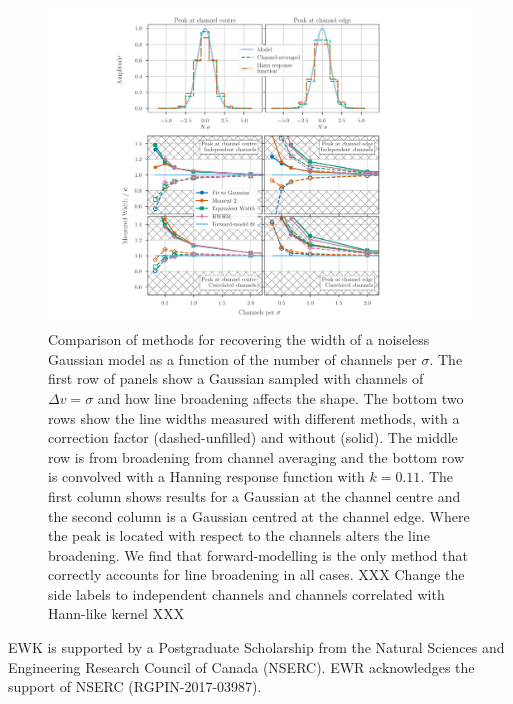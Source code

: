 \documentclass{rnaastex}
\begin{document}
\begin{figure}
\includegraphics[width=\textwidth]{combined_figure}
\caption{\label{fig:width_recovery_comparison} Comparison of methods for recovering the width of a noiseless Gaussian model as a function of the number of channels per $\sigma$. The first row of panels show a Gaussian sampled with channels of $\Delta v=\sigma$ and how line broadening affects the shape.  The bottom two rows show the line widths measured with different methods, with a correction factor (dashed-unfilled) and without (solid). The middle row is from broadening from channel averaging and the bottom row is convolved with a Hanning response function with $k=0.11$. The first column shows results for a Gaussian at the channel centre and the second column is a Gaussian centred at the channel edge.  Where the peak is located with respect to the channels alters the line broadening.  We find that forward-modelling is the only method that correctly accounts for line broadening in all cases. XXX Change the side labels to independent channels and channels correlated with Hann-like kernel XXX}
\end{figure}

\acknowledgments

EWK is supported by a Postgraduate Scholarship from the Natural Sciences and Engineering Research Council of Canada (NSERC). EWR acknowledges the support of NSERC (RGPIN-2017-03987).

\end{document}
